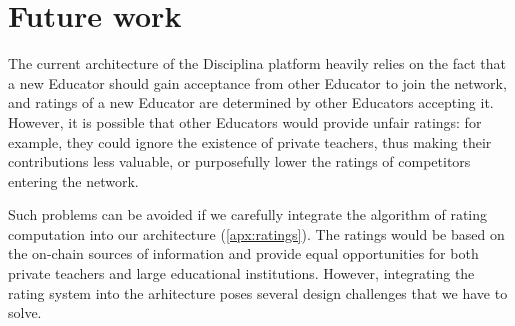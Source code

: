 \section{Future work}
The current architecture of the Disciplina platform heavily relies on the
fact that a new Educator should gain acceptance from other Educator to join the
network, and ratings of a new Educator are determined by other Educators
accepting it. However, it is possible that other Educators would provide unfair ratings: for example,
they could ignore the existence of private teachers, thus making their
contributions less valuable, or purposefully lower the ratings of competitors
entering the network.

Such problems can be avoided if we carefully integrate the
algorithm of rating computation into our architecture (\ref{apx:ratings}). The ratings would be
based on the on-chain sources of information and provide equal opportunities for
both private teachers and large educational institutions. However, integrating
the rating system into the arhitecture poses several design challenges that we
have to solve.
